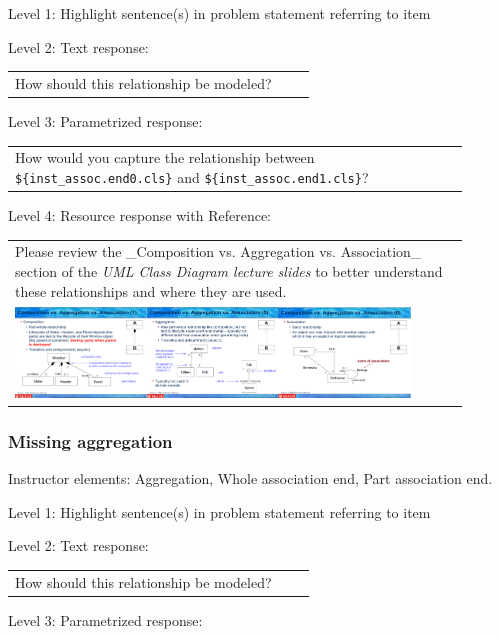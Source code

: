 \noindent Level 1: Highlight sentence(s) in problem statement referring to item \medskip

\noindent Level 2: Text response: \medskip

\begin{tabular}{|p{0.9\linewidth}}
How should this relationship be modeled?
\end{tabular} \medskip

\noindent Level 3: Parametrized response: \medskip

\begin{tabular}{|p{0.9\linewidth}}
How would you capture the relationship between \verb|${inst_assoc.end0.cls}| and \verb|${inst_assoc.end1.cls}|?
\end{tabular} \medskip

\noindent Level 4: Resource response with Reference: \medskip

\begin{tabular}{|p{0.9\linewidth}}
Please review the _Composition vs. Aggregation vs. Association_ section of 
the \textit{UML Class Diagram lecture slides} to 
better understand these relationships and where they are used.

\\
\includegraphics[width=0.9\textwidth]{images/composition_aggregation_association.png}
\end{tabular} \medskip


\subsubsection{Missing aggregation}

Instructor elements: Aggregation, Whole association end, Part association end. \medskip

\noindent Level 1: Highlight sentence(s) in problem statement referring to item \medskip

\noindent Level 2: Text response: \medskip

\begin{tabular}{|p{0.9\linewidth}}
How should this relationship be modeled?
\end{tabular} \medskip

\noindent Level 3: Parametrized response: \medskip

